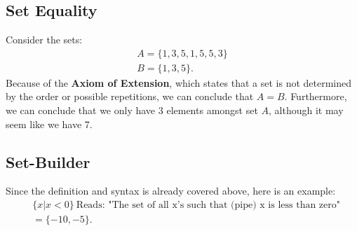 \documentclass{report}
\begin{document}
  \subsection{Set Equality}
  \bigbreak \noindent 
      Consider the sets:
    \begin{align*}
        A = \{1,3,5,1,5,5,3\} \\
        B = \{1,3,5\}
    .\end{align*}
    \bigbreak \noindent 
    Because of the \textbf{Axiom of Extension}, which states that a set is not determined by the order or possible repetitions, we can conclude that $A=B$.
    \bigbreak \noindent 
    Furthermore, we can conclude that we only have $3$ elements amongst set $A$, although it may seem like we have 7.

    \bigbreak \noindent \bigbreak \noindent 
    \subsection{Set-Builder}
    \bigbreak \noindent 
    Since the definition and syntax is already covered above, here is an example:
    \begin{align*}
        &\{x | x < 0 \}\ \text{Reads: "The set of all x's such that (pipe) x is less than zero"} \\
        &= \{-10,-5\}
    .\end{align*}

    \pagebreak \bigbreak \noindent 
\end{document}
